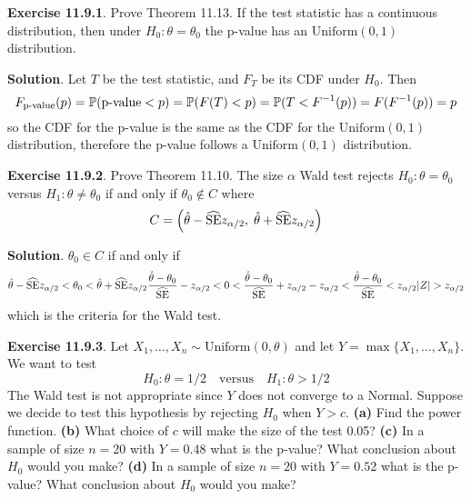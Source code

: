 \textbf{Exercise 11.9.1}. Prove Theorem 11.13.
If the test statistic has a continuous distribution, then under
\(H_{0}: \theta = \theta_{0}\) the p-value has an \(\text{Uniform}(0, 1)\)
distribution.

\textbf{Solution}. Let \(T\) be the test statistic, and \(F_T\) be its
CDF under \(H_{0}\). Then
\[
F_\text{p-value}(p) = \operatorname{\mathbb{P}}(\text{p-value} < p) = \operatorname{\mathbb{P}}(F(T) < p) = \operatorname{\mathbb{P}}(T < F^{-1}(p)) = F(F^{-1}(p)) = p
\]
so the CDF for the p-value is the same as the CDF for the
\(\text{Uniform}(0, 1)\) distribution, therefore the p-value follows a
\(\text{Uniform}(0, 1)\) distribution.

\textbf{Exercise 11.9.2}. Prove Theorem 11.10.
The size \(\alpha\) Wald test rejects \(H_{0}: \theta = \theta_{0}\) versus
\(H_{1}: \theta \neq \theta_{0}\) if and only if \(\theta_{0} \notin C\) where
\[
C = \left(\hat{\theta} - \widehat{\SE} z_{\alpha/2}, \; \hat{\theta} + \widehat{\SE} z_{\alpha / 2} \right)
\]

\textbf{Solution}.
\(\theta_{0} \in C\) if and only if
\[
\hat{\theta} - \widehat{\operatorname{\mathrm{SE}}} z_{\alpha/2} < \theta_{0} < \hat{\theta} + \widehat{\operatorname{\mathrm{SE}}} z_{\alpha/2} \\
\frac{\hat{\theta} - \theta_{0}}{\widehat{\operatorname{\mathrm{SE}}}} - z_{\alpha/2} < 0 < \frac{\hat{\theta} - \theta_{0}}{\widehat{\operatorname{\mathrm{SE}}}} +  z_{\alpha/2} \\
- z_{\alpha/2} < \frac{\hat{\theta} - \theta_{0}}{\widehat{\operatorname{\mathrm{SE}}}} < z_{\alpha/2} \\
|Z| > z_{\alpha/2}
\]
which is the criteria for the Wald test.

\textbf{Exercise 11.9.3}. Let
\(X_{1}, \dots, X_{n} \sim \text{Uniform}(0, \theta)\) and let
\(Y = \max \{ X_{1}, \dots, X_{n} \}\). We want to test
\[
H_{0}: \theta = 1/2 \quad \text{versus} \quad H_{1}: \theta > 1/2
\]
The Wald test is not appropriate since \(Y\) does not converge to a
Normal. Suppose we decide to test this hypothesis by rejecting \(H_{0}\)
when \(Y > c\).
\textbf{(a)} Find the power function.
\textbf{(b)} What choice of \(c\) will make the size of the test 0.05?
\textbf{(c)} In a sample of size \(n = 20\) with \(Y = 0.48\) what is
the p-value? What conclusion about \(H_{0}\) would you make?
\textbf{(d)} In a sample of size \(n = 20\) with \(Y = 0.52\) what is
the p-value? What conclusion about \(H_{0}\) would you make?

